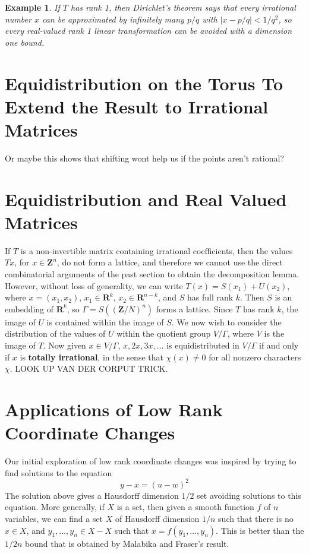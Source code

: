 \documentclass{report}
\theoremstyle{plain}
\newtheorem*{example}{Example}
\theoremstyle{plain}
\begin{document}
\begin{example}
    If $T$ has rank 1, then Dirichlet's theorem says that every irrational number $x$ can be approximated by infinitely many $p/q$ with $|x - p/q| < 1/q^2$, so every real-valued rank 1 linear transformation can be avoided with a dimension one bound.
\end{example}

\section{Equidistribution on the Torus To Extend the Result to Irrational Matrices}

Or maybe this shows that shifting wont help us if the points aren't rational?

\section{Equidistribution and Real Valued Matrices}

If $T$ is a non-invertible matrix containing irrational coefficients, then the values $Tx$, for $x \in \mathbf{Z}^n$, do not form a lattice, and therefore we cannot use the direct combinatorial arguments of the past section to obtain the decomposition lemma. However, without loss of generality, we can write $T(x) = S(x_1) + U(x_2)$, where $x = (x_1,x_2)$, $x_1 \in \mathbf{R}^k$, $x_2 \in \mathbf{R}^{n-k}$, and $S$ has full rank $k$. Then $S$ is an embedding of $\mathbf{R}^k$, so $\Gamma = S((\mathbf{Z}/N)^n)$ forms a lattice. Since $T$ has rank $k$, the image of $U$ is contained within the image of $S$. We now wish to consider the distribution of the values of $U$ within the quotient group $V/\Gamma$, where $V$ is the image of $T$. Now given $x \in V/\Gamma$, $x, 2x, 3x, \dots$ is equidistributed in $V/\Gamma$ if and only if $x$ is {\bf totally irrational}, in the sense that $\chi(x) \neq 0$ for all nonzero characters $\chi$. LOOK UP VAN DER CORPUT TRICK.

\section{Applications of Low Rank Coordinate Changes}

Our initial exploration of low rank coordinate changes was inspired by trying to find solutions to the equation
%
\[ y - x = (u - w)^2 \]
%
The solution above gives a Hausdorff dimension $1/2$ set avoiding solutions to this equation. More generally, if $X$ is a set, then given a smooth function $f$ of $n$ variables, we can find a set $X$ of Hausdorff dimension $1/n$ such that there is no $x \in X$, and $y_1, \dots, y_n \in X - X$ such that $x = f(y_1, \dots, y_n)$. This is better than the $1/2n$ bound that is obtained by Malabika and Fraser's result.
\end{document}
